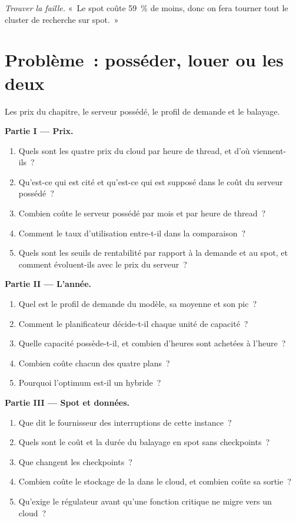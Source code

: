 \begin{exercise}[$\star\star\star$]\label{exo:pl:cloud-against-on-premises:8}
\emph{Trouver la faille.} «~Le spot coûte 59~\% de moins, donc on fera tourner tout le cluster de recherche sur spot.~»
\end{exercise}

\section{Problème~: posséder, louer ou les deux}

\begin{problem}\label{pb:pl:cloud-against-on-premises:1}
Les prix du chapitre, le serveur possédé, le profil de demande et le balayage.

\medskip\noindent\textbf{Partie I --- Prix.}
\begin{enumerate}
\item Quels sont les quatre prix du cloud par heure de thread, et d'où viennent-ils~?
\item Qu'est-ce qui est cité et qu'est-ce qui est supposé dans le coût du serveur possédé~?
\item Combien coûte le serveur possédé par mois et par heure de thread~?
\item Comment le taux d'utilisation entre-t-il dans la comparaison~?
\item Quels sont les seuils de rentabilité par rapport à la demande et au spot, et comment évoluent-ils avec le prix du serveur~?
\end{enumerate}

\medskip\noindent\textbf{Partie II --- L'année.}
\begin{enumerate}[resume]
\item Quel est le profil de demande du modèle, sa moyenne et son pic~?
\item Comment le planificateur décide-t-il chaque unité de capacité~?
\item Quelle capacité possède-t-il, et combien d'heures sont achetées à l'heure~?
\item Combien coûte chacun des quatre plans~?
\item Pourquoi l'optimum est-il un hybride~?
\end{enumerate}

\medskip\noindent\textbf{Partie III --- Spot et données.}
\begin{enumerate}[resume]
\item Que dit le fournisseur des interruptions de cette instance~?
\item Quels sont le coût et la durée du balayage en spot sans checkpoints~?
\item Que changent les checkpoints~?
\item Combien coûte le stockage de la  dans le cloud, et combien coûte sa sortie~?
\item Qu'exige le régulateur avant qu'une fonction critique ne migre vers un cloud~?
\end{enumerate}


\end{problem}
